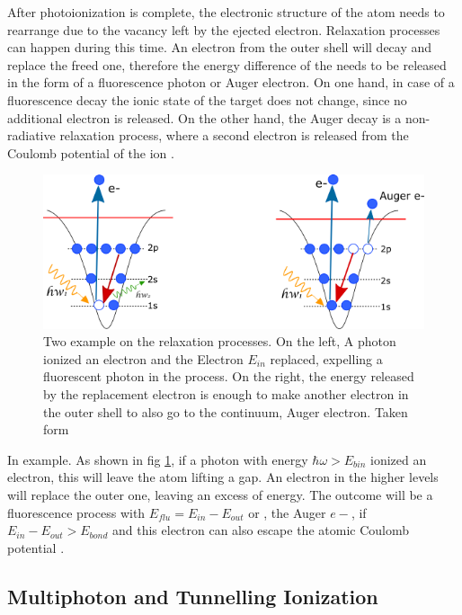 After photoionization is complete, the electronic structure of the atom needs to rearrange due to the vacancy left by the ejected electron. Relaxation processes can happen during this time. An electron from the outer shell will decay and replace the freed one, therefore the energy difference of the needs to be released in the form of a fluorescence photon or Auger electron. On one hand, in case of a fluorescence decay the ionic state of the target does not change, since no additional electron is released. On the other hand, the Auger decay is a non-radiative relaxation process, where a second electron is released from the Coulomb potential of the ion \cite{rafipoor_two-color_2017}.
\begin{figure}[h!] 

\centering
\includegraphics[width=12 cm]{../Images/text6418.png}
\caption[Relaxation processes for photoionization]{Two example on the relaxation processes. On the left, A photon ionized an electron and the Electron $E_{in}$ replaced, expelling a fluorescent photon in the process. On the right, the energy released by the replacement electron is enough to make another electron in the outer shell to also go to the continuum, Auger electron. Taken form \cite{rafipoor_two-color_2017}}
\label{fig:augerfluorec}
\end{figure} 

In example. As shown in fig \ref{fig:augerfluorec}, if a photon  with energy $\hbar\omega > E_{bin}$  ionized an electron, this will leave the atom lifting a gap. An electron in the higher levels will replace the outer one, leaving an excess of energy. The outcome will be a fluorescence process with $E_{flu} = E_{in}- E_{out}$ or , the Auger $e-$, if $ E_{in}-E_{out} > E_{bond}$ and this electron can also escape the atomic Coulomb potential \cite{schmidt_electron_1997}.



\subsection{Multiphoton and Tunnelling Ionization}

